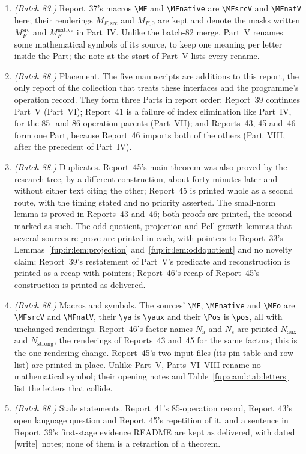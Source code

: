 \documentclass[11pt,letterpaper]{article}
\theoremstyle{definition}\newtheorem{definition}[theorem]{Definition}
\theoremstyle{remark}\newtheorem{remark}[theorem]{Remark}
\newcommand{\pos}{\mathbb Z_{>0}}
\newcommand{\MFnat}{M_{F}^{\mathrm{native}}}
\newcommand{\MFsrc}{M_F^{\mathrm{src}}}
\newcommand{\MFsrcV}{M_{F,\mathrm{src}}}
\newcommand{\MFnatV}{M_{F,0}}
\newcommand{\Na}{N_{\mathrm{aux}}}\newcommand{\Nk}{N_{\mathrm{index}}}\newcommand{\Nt}{N_{\mathrm{transport}}}
\newcommand{\Ns}{N_{\mathrm{strong}}}
\newcommand{\wtag}{\textup{[write]}}
\begin{document}
\begin{enumerate}
\item \emph{(Batch 83.)} Report~37's macros \verb|\MF| and \verb|\MFnative| are \verb|\MFsrcV| and \verb|\MFnatV| here; their renderings $\MFsrcV$ and $\MFnatV$ are kept and denote the masks written $\MFsrc$ and $\MFnat$ in Part~IV. Unlike the batch-82 merge, Part~V renames some mathematical symbols of its source, to keep one meaning per letter inside the Part; the note at the start of Part~V lists every rename.
\item \emph{(Batch 88.)} Placement. The five manuscripts are additions to this report, the only report of the collection that treats these interfaces and the programme's operation record. They form three Parts in report order: Report~39 continues Part~V (Part~VI); Report~41 is a failure of index elimination like Part~IV, for the 85- and 86-operation parents (Part~VII); and Reports~43, 45 and~46 form one Part, because Report~46 imports both of the others (Part~VIII, after the precedent of Part~IV).
\item \emph{(Batch 88.)} Duplicates. Report~45's main theorem was also proved by the research tree, by a different construction, about forty minutes later and without either text citing the other; Report~45 is printed whole as a second route, with the timing stated and no priority asserted. The small-norm lemma is proved in Reports~43 and~46; both proofs are printed, the second marked as such. The odd-quotient, projection and Pell-growth lemmas that several sources re-prove are printed in each, with pointers to Report~33's Lemmas~\ref{fup:ir:lem:projection} and~\ref{fup:ir:lem:oddquotient} and no novelty claim; Report~39's restatement of Part~V's predicate and reconstruction is printed as a recap with pointers; Report~46's recap of Report~45's construction is printed as delivered.
\item \emph{(Batch 88.)} Macros and symbols. The sources' \verb|\MF|, \verb|\MFnative| and \verb|\MFo| are \verb|\MFsrcV| and \verb|\MFnatV|, their \verb|\ya| is \verb|\yaux| and their \verb|\Pos| is \verb|\pos|, all with unchanged renderings. Report~46's factor names $N_{\mathrm a}$ and $N_{\mathrm s}$ are printed $\Na$ and $\Ns$, the renderings of Reports~43 and~45 for the same factors; this is the one rendering change. Report~45's two input files (its pin table and row list) are printed in place. Unlike Part~V, Parts~VI--VIII rename no mathematical symbol; their opening notes and Table~\ref{fup:cand:tab:letters} list the letters that collide.
\item \emph{(Batch 88.)} Stale statements. Report~41's 85-operation record, Report~43's open language question and Report~45's repetition of it, and a sentence in Report~39's first-stage evidence README are kept as delivered, with dated \wtag\ notes; none of them is a retraction of a theorem.
\end{enumerate}
\end{document}
